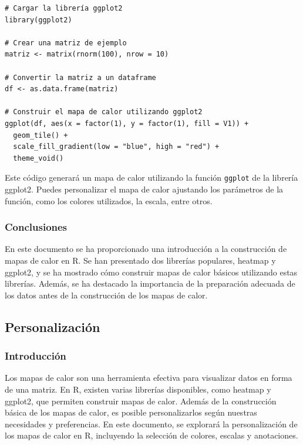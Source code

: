 \documentclass{article}
\begin{document}
\begin{verbatim}
# Cargar la librería ggplot2
library(ggplot2)

# Crear una matriz de ejemplo
matriz <- matrix(rnorm(100), nrow = 10)

# Convertir la matriz a un dataframe
df <- as.data.frame(matriz)

# Construir el mapa de calor utilizando ggplot2
ggplot(df, aes(x = factor(1), y = factor(1), fill = V1)) +
  geom_tile() +
  scale_fill_gradient(low = "blue", high = "red") +
  theme_void()
\end{verbatim}

Este código generará un mapa de calor utilizando la función \texttt{ggplot} de la librería ggplot2. Puedes personalizar el mapa de calor ajustando los parámetros de la función, como los colores utilizados, la escala, entre otros.

\subsubsection*{Conclusiones}
En este documento se ha proporcionado una introducción a la construcción de mapas de calor en R. Se han presentado dos librerías populares, heatmap y ggplot2, y se ha mostrado cómo construir mapas de calor básicos utilizando estas librerías. Además, se ha destacado la importancia de la preparación adecuada de los datos antes de la construcción de los mapas de calor. 



\subsection{Personalización}


\subsubsection{Introducción}
Los mapas de calor son una herramienta efectiva para visualizar datos en forma de una matriz. En R, existen varias librerías disponibles, como heatmap y ggplot2, que permiten construir mapas de calor. Además de la construcción básica de los mapas de calor, es posible personalizarlos según nuestras necesidades y preferencias. En este documento, se explorará la personalización de los mapas de calor en R, incluyendo la selección de colores, escalas y anotaciones.
\end{document}
